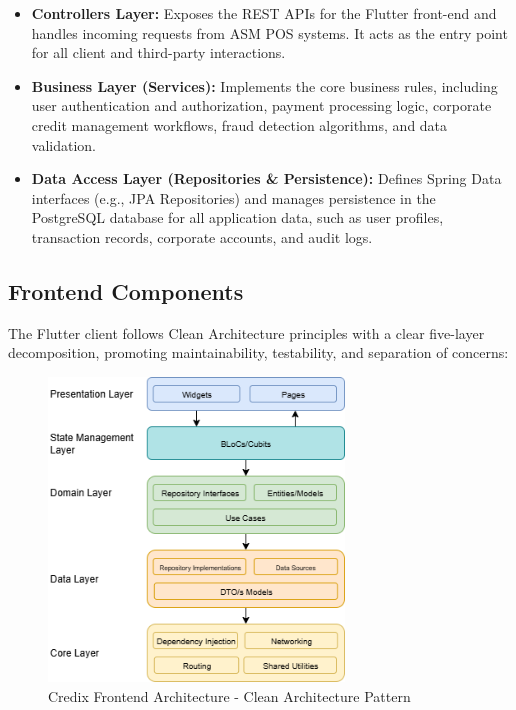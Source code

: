 \begin{itemize}
    \item \textbf{Controllers Layer:} Exposes the REST APIs for the Flutter front-end and handles incoming requests from ASM POS systems. It acts as the entry point for all client and third-party interactions.
    \item \textbf{Business Layer (Services):} Implements the core business rules, including user authentication and authorization, payment processing logic, corporate credit management workflows, fraud detection algorithms, and data validation.
    \item \textbf{Data Access Layer (Repositories \& Persistence):} Defines Spring Data interfaces (e.g., JPA Repositories) and manages persistence in the PostgreSQL database for all application data, such as user profiles, transaction records, corporate accounts, and audit logs.
\end{itemize}

\subsection{Frontend Components}

The Flutter client follows Clean Architecture principles with a clear five-layer decomposition, promoting maintainability, testability, and separation of concerns:

\begin{figure}[H]
    \centering
    \includegraphics[width=0.7\textwidth]{images/frontend_architecture_diagram.png}
    \caption{Credix Frontend Architecture - Clean Architecture Pattern}
    \label{fig:frontend_architecture}
\end{figure}

